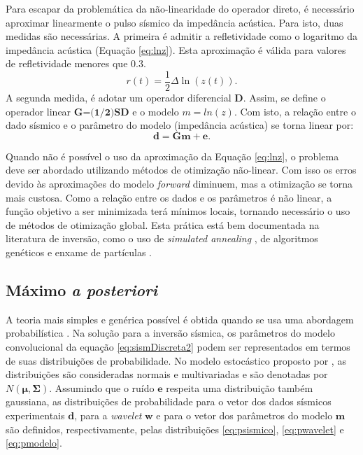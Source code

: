 Para escapar da problemática da não-linearidade do operador direto, é
necessário aproximar linearmente o pulso sísmico da impedância acústica.
Para isto, duas medidas são necessárias. A primeira é admitir a 
refletividade como o logaritmo da impedância acústica (Equação \ref{eq:lnz}).
Esta aproximação é válida para valores de refletividade menores que $0.3$.
\begin{equation}
r(t) = \frac{1}{2}\Delta \ln(z(t)).
\label{eq:lnz}
\end{equation}
A segunda medida, é adotar um operador diferencial $\textbf{D}$. Assim,
se define o operador linear $\textbf{G=(1/2)SD}$ e o modelo $m=ln(z)$.
Com isto, a relação entre o dado sísmico e o parâmetro do modelo (impedância acústica)
se torna linear por:
\begin{equation}
\label{eq:sismDiscreta2}
\mathbf{d = Gm + e}.
\end{equation}

Quando não é possível o uso da aproximação da Equação \ref{eq:lnz}, o problema
deve ser abordado utilizando métodos de otimização não-linear. Com isso os erros
devido às aproximações do modelo \textit{forward} diminuem, mas a otimização se
torna mais custosa. Como a relação entre os dados e os parâmetros é não linear, a
função objetivo a ser minimizada terá mínimos locais, tornando necessário
o uso de métodos de otimização global. Esta prática está bem documentada na
literatura de inversão, como o uso de \textit{simulated annealing}
\citep{max_inv_simulated}, de algoritmos genéticos \citep{MallickGeneticInve} e
enxame de partículas \citep{zhe_nonlinear}. 

\subsection{Máximo \textit{a posteriori}}
\label{sec:map}

A teoria mais simples e genérica possível é obtida quando se usa uma
abordagem probabilística \citep{tarantola}. Na solução para a inversão
sísmica, os parâmetros do modelo convolucional da equação \ref{eq:sismDiscreta2}
podem ser representados em termos de suas distribuições de probabilidade.
No modelo estocástico proposto por \cite{leandroGRSL}, as distribuições
são consideradas normais e multivariadas e são denotadas por $N(\boldsymbol{\mu},\boldsymbol{\Sigma})$.
Assumindo que o ruído $\boldsymbol{e}$ respeita uma distribuição também gaussiana,
as distribuições de probabilidade para o vetor dos dados sísmicos experimentais
$\boldsymbol{d}$, para a \textit{wavelet} $\boldsymbol{w}$ e para
o vetor dos parâmetros do modelo $\boldsymbol{m}$ são
definidos, respectivamente, pelas distribuições \ref{eq:psismico}, \ref{eq:pwavelet} e \ref{eq:pmodelo}.

